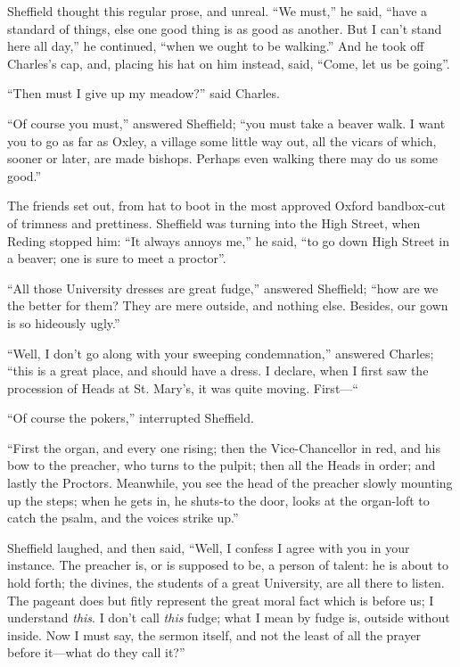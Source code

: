 Sheffield thought this regular prose, and unreal. ``We
must,'' he said, ``have a standard of things, else one good
thing is as good as another. But I can't stand here all day,'' he
continued, ``when we ought to be walking.'' And he took off
Charles's cap, and, placing his hat on him instead, said, ``Come,
let us be going''.

``Then must I give up my meadow?'' said Charles.

``Of course you must,'' answered Sheffield; ``you must
take a beaver walk. I want you to go as far as Oxley, a village
some little way out, all the vicars of which, sooner or later, are
made bishops. Perhaps even walking there may do us some good.''

The friends set out, from hat to boot in the most approved Oxford
bandbox-cut of trimness and prettiness. Sheffield was turning into the
High Street, when Reding stopped him: ``It always annoys me,''
he said, ``to go down High Street in a beaver; one is sure to meet
a proctor''.

``All those University dresses are great fudge,'' answered
Sheffield; ``how are we the better for them? They are mere
outside, and nothing else. Besides, our gown is so hideously
ugly.''

``Well, I don't go along with your sweeping condemnation,''
answered Charles; ``this is a great place, and should have a
dress. I declare, when I first saw the procession of Heads at St. Mary's,
it was quite moving. First—``

``Of course the pokers,'' interrupted Sheffield.

``First the organ, and every one rising; then the
Vice-Chancellor in red, and his bow to the preacher, who turns to the
pulpit; then all the Heads in order; and lastly the Proctors.
Meanwhile, you see the head of the preacher slowly mounting up the
steps; when he gets in, he shuts-to the door, looks at the organ-loft
to catch the psalm, and the voices strike up.''

Sheffield laughed, and then said, ``Well, I confess I agree
with you in your instance. The preacher is, or is supposed to be, a
person of talent: he is about to hold forth; the divines, the students
of a great University, are all there to listen. The pageant does but
fitly represent the great moral fact which is before us; I
understand \emph{this}. I don't call \emph{this} fudge; what I mean by
fudge is, outside without inside. Now I must say, the sermon itself,
and not the least of all the prayer before it—what do they call
it?''


